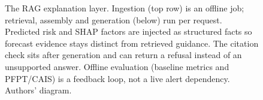 \begin{figure}[htbp]
\caption[RAG explanation layer: ingestion, retrieval, assembly and generation]{The RAG explanation layer. Ingestion (top row) is an offline job; retrieval, assembly and
generation (below) run per request. Predicted risk and SHAP factors are injected as structured
facts so forecast evidence stays distinct from retrieved guidance. The citation check sits after
generation and can return a refusal instead of an unsupported answer. Offline evaluation
(baseline metrics and PFPT/CAIS) is a feedback loop, not a live alert dependency. Authors' diagram.}
\label{fig:rag}
\end{figure}
